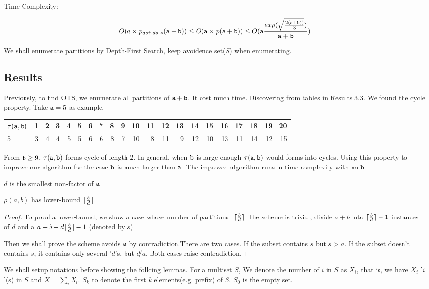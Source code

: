 Time Complexity: 

\[
O(a\times p_{aoivds\ \mathtt{a}}(\mathtt{a}+\mathtt{b}))\\
\leq O(\mathtt{a}\times p(\mathtt{a}+\mathtt{b}))\\
\leq O(\mathtt{a}\frac{exp(\sqrt{\frac{2(\mathtt{a}+\mathtt{b}))}{3} } )}{\mathtt{a}+\mathtt{b}})
\]
\begin{remark}
We shall enumerate partitions by Depth-First Search, keep avoidence set($S$) when enumerating.
\end{remark}
\pagebreak
\subsection{Results}

\pagebreak

Previously, to find OTS, we enumerate all partitions of $\mathtt{a}+\mathtt{b}$. It cost much time. Discovering from tables in Results 3.3. We found the cycle property. Take $\mathtt{a}=5$ as example.
\begin{tabular}{l|rrrrrrrrrrrrrrrrrrrr}
 $\tau(\mathtt{a},\mathtt{b})$ &  1 &  2 &  3 &  4 &  5 &  6 &  7 &  8 &  9 & 10 & 11 & 12 & 13 & 14 & 15 & 16 & 17 & 18 & 19 & 20 \\
\hline
 5        &  3 &  4 &  4 &  5 &  5 &  6 &  6 &  8 &  7 & 10 &  8 & 11 &  9 & 12 & 10 & 13 & 11 & 14 & 12 & 15 \\
\hline
\end{tabular}

From $\mathtt{b}\geq 9$, $\tau(\mathtt{a},\mathtt{b})$ forms cycle of length $2$. In general, when $\mathtt{b}$ is large enough $\tau(\mathtt{a},\mathtt{b})$ would forms into cycles.
Using this property to improve our algorithm for the case $\mathtt{b}$ is much larger than $\mathtt{a}$. The improved algorithm runs in time complexity with no $\mathtt{b}$.

\begin{definition}
$d$ is the smallest non-factor of $\mathtt{a}$
\end{definition}
\begin{lemma}
$\rho(a,b)$ has lower-bound $\lceil\frac{b}{d}\rceil$
\end{lemma} 

\begin{proof}
To proof a lower-bound, we show a case whose number of partitions=$\lceil\frac{b}{d}\rceil$
The scheme is trivial, divide $a+b$ into $\lceil\frac{b}{d}\rceil-1$ instances of $d$ and a $a+b-d\lceil\frac{b}{d}\rceil-1$ (denoted by $s$)

Then we shall prove the scheme avoids $\mathtt{a}$ by contradiction.There are two cases.
If the subset contains $s$ but $s>a$.
If the subset doesn't contains $s$, it contains only several '$d$'s, but $d\not| a$.
Both cases raise contradiction.
\end{proof}
We shall setup notations before showing the folloing lemmas.  For a multiset $S$, 
We denote the number of $i$ in $S$ as $X_i$, that is, we have $X_i$ '$i$'(s) in $S$ and $X = \sum_i{X_i}$.
$S_k$ to denote the first $k$ elements(e.g. prefix) of $S$. $S_0$ is the empty set.

